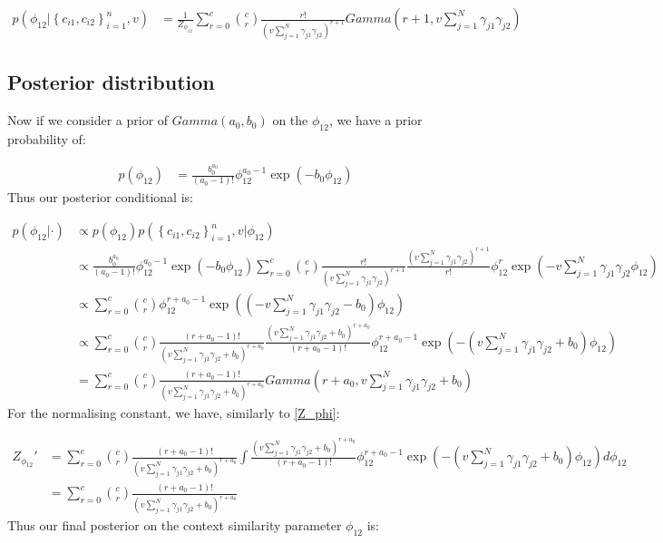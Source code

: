 \documentclass[fleqn,11pt]{wlscirep}
\begin{document}
\begin{align}
p(\phi_{12} | \left\{c_{i1}, c_{i2}\right\}_{i=1}^n, v) &= \frac{1}{Z_{\phi_{12}}}  \sum_{r=0}^c  \binom{c}{r} \frac{r!}{\left(v \sum_{j=1}^N \gamma_{j1} \gamma_{j2}\right)^{r+1}} Gamma\left(r+1, v \sum_{j=1}^N \gamma_{j1} \gamma_{j2} \right)
\end{align}

\subsection{Posterior distribution}

Now if we consider a prior of $Gamma(a_0, b_0)$ on the $\phi_{12}$, we have a prior probability of:

\begin{align}
p(\phi_{12}) &= \frac{b_0^{a_0}}{(a_0 - 1)!}\phi_{12}^{a_0 - 1}\exp\left(-b_0 \phi_{12} \right)
\end{align}
Thus our posterior conditional is:

\begin{align}
p(\phi_{12} | \cdot) &\propto p(\phi_{12}) p(\left\{c_{i1}, c_{i2}\right\}_{i=1}^n, v | \phi_{12})  \\
&\propto \frac{b_0^{a_0}}{(a_0 - 1)!}\phi_{12}^{a_0 - 1}\exp\left(-b_0 \phi_{12} \right)  \sum_{r=0}^c  \binom{c}{r} \frac{r!}{\left(v \sum_{j=1}^N \gamma_{j1} \gamma_{j2}\right)^{r+1}}  \frac{\left(v \sum_{j=1}^N \gamma_{j1} \gamma_{j2}\right)^{r+1}}{r!}\phi_{12}^r \exp\left(-v \sum_{j=1}^N \gamma_{j1} \gamma_{j2}\phi_{12}\right) \\
&\propto \sum_{r=0}^c  \binom{c}{r} \phi_{12}^{r + a_0 - 1} \exp \left( \left(-v \sum_{j=1}^N \gamma_{j1} \gamma_{j2}  -b_0 \right)\phi_{12}\right) \\
&\propto \sum_{r=0}^c  \binom{c}{r} \frac{(r + a_0 - 1)!}{ \left(v \sum_{j=1}^N \gamma_{j1} \gamma_{j2} + b_0 \right)^{r + a_0}} \frac{ \left(v \sum_{j=1}^N \gamma_{j1} \gamma_{j2} + b_0 \right)^{r + a_0}}{(r + a_0 - 1)!} \phi_{12}^{r + a_0 - 1} \exp \left( - \left(v \sum_{j=1}^N \gamma_{j1} \gamma_{j2} + b_0 \right)\phi_{12}\right) \\
&= \sum_{r=0}^c  \binom{c}{r} \frac{(r + a_0 - 1)!}{ \left(v \sum_{j=1}^N \gamma_{j1} \gamma_{j2} + b_0 \right)^{r + a_0}} Gamma \left(r+ a_0, v \sum_{j=1}^N \gamma_{j1} \gamma_{j2} + b_0 \right)
\end{align}
For the normalising constant, we have, similarly to \eqref{Z_phi}:

\begin{align}
Z_{\phi_{12}}' &=\sum_{r=0}^c  \binom{c}{r} \frac{(r + a_0 - 1)!}{ \left(v \sum_{j=1}^N \gamma_{j1} \gamma_{j2} + b_0 \right)^{r + a_0}}  \int \frac{ \left(v \sum_{j=1}^N \gamma_{j1} \gamma_{j2} + b_0 \right)^{r + a_0}}{(r + a_0 - 1)!} \phi_{12}^{r + a_0 - 1} \exp \left( - \left(v \sum_{j=1}^N \gamma_{j1} \gamma_{j2} + b_0 \right)\phi_{12}\right) d\phi_{12} \\
&= \sum_{r=0}^c \binom{c}{r} \frac{(r + a_0 - 1)!}{ \left(v \sum_{j=1}^N \gamma_{j1} \gamma_{j2} + b_0 \right)^{r + a_0}} 
\end{align}
Thus our final posterior on the context similarity parameter $\phi_{12}$ is:
\end{document}
